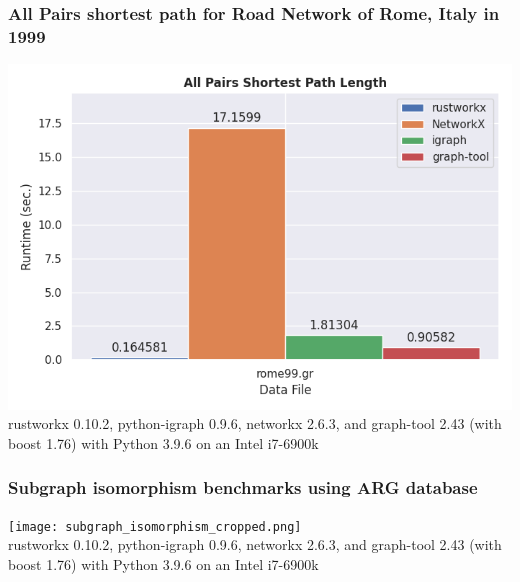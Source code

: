 \documentclass[aspectratio=169,11pt,hyperref={colorlinks=true}]{beamer}
\begin{document}
\begin{frame}
    \frametitle{All Pairs shortest path for Road Network of Rome, Italy in 1999\footnotemark}
    \centering
    \includegraphics[height=.7\textheight]{all_pairs.png}\\
    \tiny
    rustworkx 0.10.2, python-igraph 0.9.6, networkx 2.6.3, and graph-tool 2.43 (with boost 1.76) with Python 3.9.6 on an Intel i7-6900k\\

\end{frame}

\begin{frame}
    \frametitle{Subgraph isomorphism benchmarks using ARG database\footnotemark}
    \centering
    \texttt{[image: subgraph\_isomorphism\_cropped.png]}\\
    \tiny
    rustworkx 0.10.2, python-igraph 0.9.6, networkx 2.6.3, and graph-tool 2.43 (with boost 1.76) with Python 3.9.6 on an Intel i7-6900k\\
\end{frame}
\end{document}
